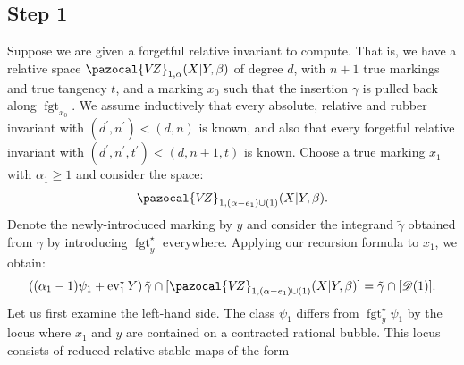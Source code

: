 \documentclass[11pt]{amsart}
\newcommand{\VZ}{\pazocal{V\!Z}}
\newcommand{\st}{\star}
\newcommand{\ev}{\operatorname{ev}}
\newcommand{\fgt}{\operatorname{fgt}}
\newcommand{\Dcal}{\mathcal{D}}
\theoremstyle{definition}
\theoremstyle{definition}
\begin{document}
\subsection*{Step 1} Suppose we are given a forgetful relative invariant to compute. That is, we have a relative space $\VZ_{1,\alpha}(X|Y,\beta)$ of degree $d$, with $n+1$ true markings and true tangency $t$, and a marking $x_0$ such that the insertion $\gamma$ is pulled back along $\fgt_{x_0}$. We assume inductively that every absolute, relative and rubber invariant with $(d^\prime,n^\prime) < (d,n)$ is known, and also that every forgetful relative invariant with $(d^\prime,n^\prime,t^\prime) < (d,n+1,t)$ is known. Choose a true marking $x_1$ with $\alpha_1 \geq 1$ and consider the space:
\begin{equation*} \VZ_{1,(\alpha-e_1) \cup (1)}(X|Y,\beta). \end{equation*}
Denote the newly-introduced marking by $y$ and consider the integrand $\tilde\gamma$ obtained from $\gamma$ by introducing $\fgt_y^\st$ everywhere. Applying our recursion formula to $x_1$, we obtain:
\begin{equation}\label{step 1 recursion}\left( (\alpha_1-1)\psi_1 + \ev_1^\st Y\right) \tilde\gamma \cap [\VZ_{1,(\alpha-e_1) \cup (1)}(X|Y,\beta)] = \tilde\gamma \cap [\Dcal(1)].\end{equation}
Let us first examine the left-hand side. The class $\psi_1$ differs from $\fgt_y^\st \psi_1$ by the locus where $x_1$ and $y$ are contained on a contracted rational bubble. This locus consists of reduced relative stable maps of the form \medskip
\end{document}
